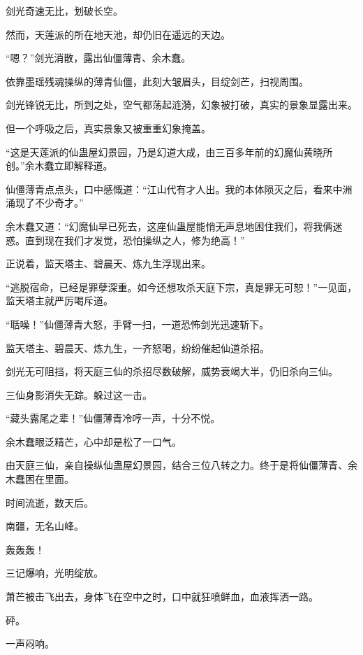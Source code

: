 
\begin{this_body}



剑光奇速无比，划破长空。

然而，天莲派的所在地天池，却仍旧在遥远的天边。

“嗯？”剑光消散，露出仙僵薄青、余木蠢。

依靠墨瑶残魂操纵的薄青仙僵，此刻大皱眉头，目绽剑芒，扫视周围。

剑光锋锐无比，所到之处，空气都荡起涟漪，幻象被打破，真实的景象显露出来。

但一个呼吸之后，真实景象又被重重幻象掩盖。

“这是天莲派的仙蛊屋幻景园，乃是幻道大成，由三百多年前的幻魔仙黄晓所创。”余木蠢立即解释道。

仙僵薄青点点头，口中感慨道：“江山代有才人出。我的本体陨灭之后，看来中洲涌现了不少奇才。”

余木蠢又道：“幻魔仙早已死去，这座仙蛊屋能悄无声息地困住我们，将我俩迷惑。直到现在我们才发觉，恐怕操纵之人，修为绝高！”

正说着，监天塔主、碧晨天、炼九生浮现出来。

“逃脱宿命，已经是罪孽深重。如今还想攻杀天庭下宗，真是罪无可恕！”一见面，监天塔主就严厉喝斥道。

“聒噪！”仙僵薄青大怒，手臂一扫，一道恐怖剑光迅速斩下。

监天塔主、碧晨天、炼九生，一齐怒喝，纷纷催起仙道杀招。

剑光无可阻挡，将天庭三仙的杀招尽数破解，威势衰竭大半，仍旧杀向三仙。

三仙身影消失无踪。躲过这一击。

“藏头露尾之辈！”仙僵薄青冷哼一声，十分不悦。

余木蠢眼泛精芒，心中却是松了一口气。

由天庭三仙，亲自操纵仙蛊屋幻景园，结合三位八转之力。终于是将仙僵薄青、余木蠢困在里面。

时间流逝，数天后。

南疆，无名山峰。

轰轰轰！

三记爆响，光明绽放。

萧芒被击飞出去，身体飞在空中之时，口中就狂喷鲜血，血液挥洒一路。

砰。

一声闷响。


\end{this_body}
